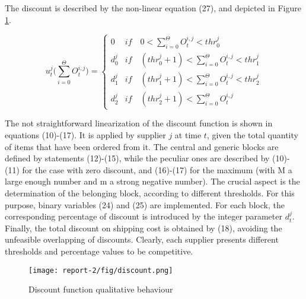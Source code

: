 \documentclass{article}
\begin{document}
The discount is described by the non-linear equation (27), and depicted in Figure \ref{fig:discount}. 

\begin{equation}
    u_t^j\Big(\sum^{\Theta}_{i=0}O_t^{i,j}\Big)=
    \begin{cases}
    0 & \textit{if} \quad 0 <\sum_{i=0}^{\Theta}O_t^{i,j}<thr^j_0\\
    d^j_0 & \textit{if} \quad (thr^j_0+1)<\sum_{i=0}^{\Theta}O_t^{i,j}<thr^j_1\\
    d^j_1 & \textit{if} \quad (thr^j_1+1)<\sum_{i=0}^{\Theta}O_t^{i,j}<thr^j_2\\
    d^j_2 & \textit{if} \quad (thr^j_2+1)<\sum_{i=0}^{\Theta}O_t^{i,j}
    \end {cases}
\end{equation}

The not straightforward linearization of the discount function is shown in equations (10)-(17). It is applied by supplier $j$ at time $t$, given the total quantity of items that have been ordered from it. The central and generic blocks are defined by statements (12)-(15), while the peculiar ones are described by (10)-(11) for the case with zero discount, and (16)-(17) for the maximum (with M a large enough number and m a strong negative number). The crucial aspect is the determination of the belonging block, according to different thresholds. For this purpose, binary variables (24) and (25) are implemented. For each block, the corresponding percentage of discount is introduced by the integer parameter $d_t^j$. Finally, the total discount on shipping cost is obtained by (18), avoiding the unfeasible overlapping of discounts.
Clearly, each supplier presents different thresholds and percentage values to be competitive. 

\begin{figure}[!ht]
    \centering
    \texttt{[image: report-2/fig/discount.png]}
    \caption{Discount function qualitative behaviour \label{fig:discount}}
\end{figure}
\end{document}
